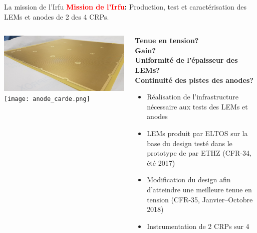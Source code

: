     \begin{frame}{La mission de l'Irfu}
        \centering \textbf{\textcolor{red}{Mission de l'Irfu}: }Production, test et caractérisation des LEMs et anodes de 2 des 4 CRPs.\\\vfill
    	\begin{scriptsize}
        	\begin{columns}
            	\begin{column}{0.5\textwidth}
                	\includegraphics[width=\textwidth]{./pictures/LEM.png}\\
                   	\texttt{[image: anode\_carde.png]}
            	\end{column}
       	        \begin{column}{0.5\textwidth}
           	        \textbf{Tenue en tension?\\
           	        Gain?\\
           	        Uniformité de l'épaisseur des LEMs?\\
           	        Continuité des pistes des anodes?\\}\vspace{0.3cm}
           	        \begin{itemize}
               	        \item Réalisation de l'infrastructure nécessaire aux tests des LEMs et anodes
               	        \item LEMs produit par ELTOS sur la base du design testé dans le prototype de \threeL{} par ETHZ (CFR-34, été 2017)
               	        \item Modification du design afin d'atteindre une meilleure tenue en tension (CFR-35, Janvier--Octobre 2018)
               	        \item Instrumentation de 2 CRPs sur 4
           	        \end{itemize}
       	        \end{column}
        	\end{columns}
   		\end{scriptsize}
    \end{frame}
    
